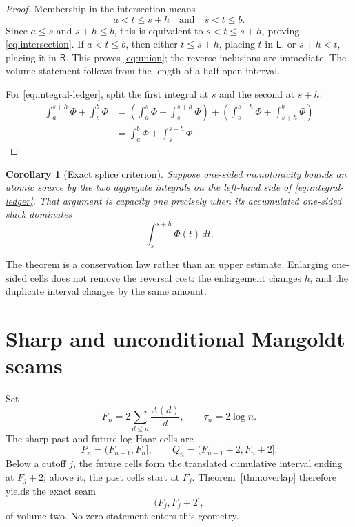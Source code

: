 \documentclass[11pt]{article}
\newtheorem{corollary}[theorem]{Corollary}
\newcommand{\Ioc}[2]{(#1,#2]}
\begin{document}
\begin{proof}
Membership in the intersection means
\[
 a<t\le s+h\quad\text{and}\quad s<t\le b.
\]
Since $a\le s$ and $s+h\le b$, this is equivalent to $s<t\le s+h$, proving
\eqref{eq:intersection}.  If $a<t\le b$, then either $t\le s+h$, placing $t$ in
$\mathsf L$, or $s+h<t$, placing it in $\mathsf R$.  This proves \eqref{eq:union}; the reverse
inclusions are immediate.  The volume statement follows from the length of a half-open interval.

For \eqref{eq:integral-ledger}, split the first integral at $s$ and the second at $s+h$:
\begin{align*}
 \int_a^{s+h}\Phi+\int_s^b\Phi
 &=\left(\int_a^s\Phi+\int_s^{s+h}\Phi\right)
   +\left(\int_s^{s+h}\Phi+\int_{s+h}^b\Phi\right)\\
 &=\int_a^b\Phi+\int_s^{s+h}\Phi.
\end{align*}
\end{proof}

\begin{corollary}[Exact splice criterion]\label{cor:criterion}
Suppose one-sided monotonicity bounds an atomic source by the two aggregate integrals on the
left-hand side of \eqref{eq:integral-ledger}.  That argument is capacity one precisely when its
accumulated one-sided slack dominates
\[
 \int_s^{s+h}\Phi(t)\,dt.
\]
\end{corollary}

The theorem is a conservation law rather than an upper estimate.  Enlarging one-sided cells does
not remove the reversal cost: the enlargement changes $h$, and the duplicate interval changes by
the same amount.

\section{Sharp and unconditional Mangoldt seams}

Set
\[
 F_n=2\sum_{d\le n}\frac{\Lambda(d)}d,
 \qquad \tau_n=2\log n.
\]
The sharp past and future log-Haar cells are
\[
 P_n=\Ioc{F_{n-1}}{F_n},
 \qquad Q_n=\Ioc{F_{n-1}+2}{F_n+2}.
\]
Below a cutoff $j$, the future cells form the translated cumulative interval ending at $F_j+2$;
above it, the past cells start at $F_j$.  Theorem~\ref{thm:overlap} therefore yields the exact seam
\begin{equation}\label{eq:sharp-seam}
 \Ioc{F_j}{F_j+2},
\end{equation}
of volume two.  No zero statement enters this geometry.
\end{document}
